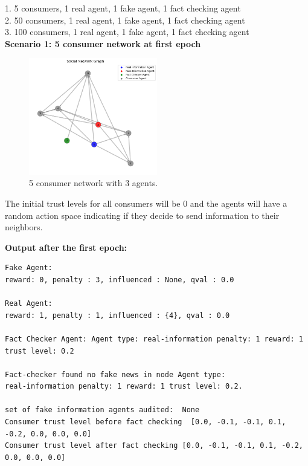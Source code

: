 \documentclass[twoside]{article}
\begin{document}
1. 5 consumers, 1 real agent, 1 fake agent, 1 fact checking agent\\
2. 50 consumers, 1 real agent, 1 fake agent, 1 fact checking agent\\
3. 100 consumers, 1 real agent, 1 fake agent, 1 fact checking agent\\

\textbf{Scenario 1: 5 consumer network at first epoch}

\begin{figure}[htbp]
     \centering
     \includegraphics[width=0.5\textwidth]{../results/images/Initial_network.png}
     \caption{5 consumer network with 3 agents.}
     \label{fig: 5 consumer network, 3 agents}
 \end{figure}
 

 The initial trust levels for all consumers will be 0 and the agents will have a random action space indicating if they decide to send information to their neighbors. 

\pagebreak
\textbf{Output after the first epoch:}

\begin{verbatim}
Fake Agent: 
reward: 0, penalty : 3, influenced : None, qval : 0.0

Real Agent: 
reward: 1, penalty : 1, influenced : {4}, qval : 0.0

Fact Checker Agent: Agent type: real-information penalty: 1 reward: 1 trust level: 0.2

Fact-checker found no fake news in node Agent type: 
real-information penalty: 1 reward: 1 trust level: 0.2.

set of fake information agents audited:  None
Consumer trust level before fact checking  [0.0, -0.1, -0.1, 0.1, -0.2, 0.0, 0.0, 0.0]
Consumer trust level after fact checking [0.0, -0.1, -0.1, 0.1, -0.2, 0.0, 0.0, 0.0]

\end{verbatim}
\end{document}
